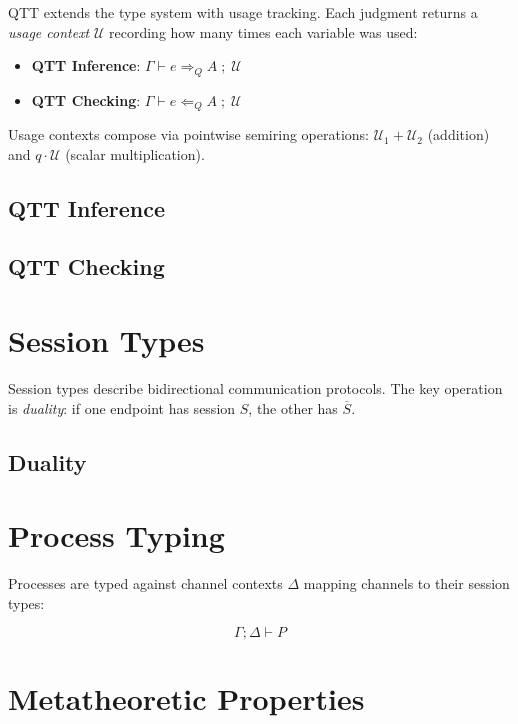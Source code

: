 \documentclass[11pt]{article}
\begin{document}
QTT extends the type system with usage tracking. Each judgment returns
a \emph{usage context} $\mathcal{U}$ recording how many times each
variable was used:

\begin{itemize}
  \item \textbf{QTT Inference}: $\Gamma \vdash e \Rightarrow_Q A \;;\; \mathcal{U}$
  \item \textbf{QTT Checking}: $\Gamma \vdash e \Leftarrow_Q A \;;\; \mathcal{U}$
\end{itemize}

Usage contexts compose via pointwise semiring operations:
$\mathcal{U}_1 + \mathcal{U}_2$ (addition) and
$q \cdot \mathcal{U}$ (scalar multiplication).

\subsection{QTT Inference}

\ottdefninferQ{}

\subsection{QTT Checking}

\ottdefncheckQ{}


\section{Session Types}

Session types describe bidirectional communication protocols. The key
operation is \emph{duality}: if one endpoint has session $S$, the other
has $\overline{S}$.

\subsection{Duality}

\ottdefndual{}


\section{Process Typing}

Processes are typed against channel contexts $\Delta$ mapping channels
to their session types:

$$\Gamma ; \Delta \vdash P$$

\ottdefntypeProc{}


\section{Metatheoretic Properties}
\end{document}
